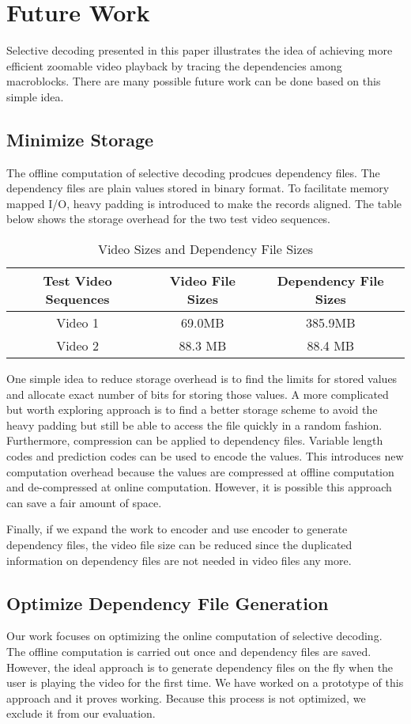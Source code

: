\section{Future Work}
Selective decoding presented in this paper illustrates the idea of achieving more efficient zoomable video playback by tracing the dependencies among macroblocks. There are many possible future work can be done based on this simple idea. 
\subsection{Minimize Storage} 
The offline computation of selective decoding prodcues dependency files. The dependency files are plain values stored in binary format. To facilitate memory mapped I/O, heavy padding is introduced to make the records aligned. The table below shows the storage overhead for the two test video sequences.
\begin{table}
\caption{Video Sizes and Dependency File Sizes}
\centering
\begin{tabular}{|c|c|c|}
\hline
Test Video Sequences & Video File Sizes & Dependency File Sizes \\
\hline
Video 1 & 69.0MB & 385.9MB \\
\hline
Video 2 & 88.3 MB & 88.4 MB \\
\hline 
\end{tabular}
\end{table}
One simple idea to reduce storage overhead is to find the limits for stored values and allocate exact number of bits for storing those values. A more complicated but worth exploring approach is to find a better storage scheme to avoid the heavy padding but still be able to access the file quickly in a random fashion. Furthermore, compression can be applied to dependency files. Variable length codes and prediction codes can be used to encode the values. This introduces new computation overhead because the values are compressed at offline computation and de-compressed at online computation. However, it is possible this approach can save a fair amount of space. 

Finally, if we expand the work to encoder and use encoder to generate dependency files, the video file size can be reduced since the duplicated information on dependency files are not needed in video files any more. 

\subsection{Optimize Dependency File Generation}
Our work focuses on optimizing the online computation of selective decoding. The offline computation is carried out once and dependency files are saved. However, the ideal approach is to generate dependency files on the fly when the user is playing the video for the first time. We have worked on a prototype of this approach and it proves working. Because this process is not optimized, we exclude it from our evaluation. 


